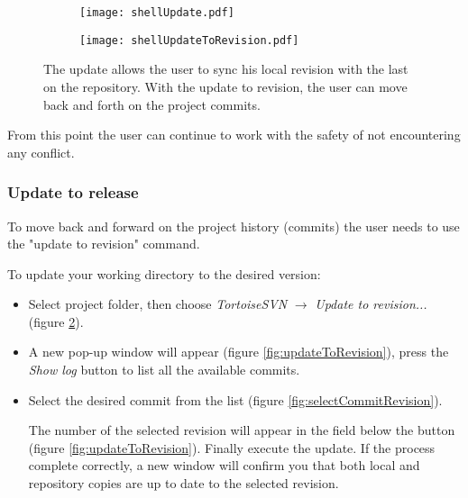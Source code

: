 \begin{figure}[htbp]
\begin{subfigure}{0.48\textwidth}
  \centering
  \texttt{[image: shellUpdate.pdf]}
  \caption{}
  \label{fig:shellUpdate}
\end{subfigure}%
\begin{subfigure}{0.48\textwidth}
  \centering
  \texttt{[image: shellUpdateToRevision.pdf]}
  \caption{}
  \label{fig:shellUpdateToRevision}
\end{subfigure}
\caption{The update allows the user to sync his local revision with the last on the repository. With the update to revision, the user can move back and forth on the project commits.}
\label{fig:svnUpdate}
\end{figure}


From this point the user can continue to work with the safety of not encountering any conflict.








\subsubsection{Update to release}
\label{subsubsection:UpdateToRelease}


To move back and forward on the project history (commits) the user needs to use the "update to revision" command.\\
\newpage

To update your working directory to the desired version:

\begin{itemize}

    \item Select project folder, then choose \textit{TortoiseSVN} $\rightarrow$ \textit{Update to revision...} (figure \ref{fig:shellUpdateToRevision}).
    
    \item A new pop-up window will appear (figure \ref{fig:updateToRevision}), press the \textit{Show log} button to list all the available commits.
    
    \item Select the desired commit from the list (figure \ref{fig:selectCommitRevision}).
    
    The number of the selected revision will appear in the field below the button (figure \ref{fig:updateToRevision}). Finally execute the update. If the process complete correctly, a new window will confirm you that both local and repository copies are up to date to the selected revision.
    
\end{itemize}






